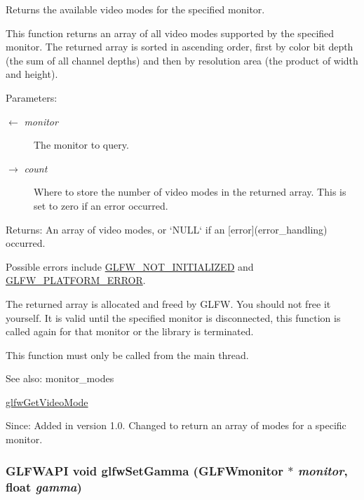 Returns the available video modes for the specified monitor. 

This function returns an array of all video modes supported by the specified monitor. The returned array is sorted in ascending order, first by color bit depth (the sum of all channel depths) and then by resolution area (the product of width and height).

\begin{Desc}
\item[Parameters:]
\begin{description}
\item[\mbox{$\leftarrow$} {\em monitor}]The monitor to query. \item[\mbox{$\rightarrow$} {\em count}]Where to store the number of video modes in the returned array. This is set to zero if an error occurred. \end{description}
\end{Desc}
\begin{Desc}
\item[Returns:]An array of video modes, or `NULL` if an \mbox{[}error\mbox{]}(error\_\-handling) occurred.\end{Desc}
Possible errors include \hyperlink{group__errors_g2374ee02c177f12e1fa76ff3ed15e14a}{GLFW\_\-NOT\_\-INITIALIZED} and \hyperlink{group__errors_gd44162d78100ea5e87cdd38426b8c7a1}{GLFW\_\-PLATFORM\_\-ERROR}.

The returned array is allocated and freed by GLFW. You should not free it yourself. It is valid until the specified monitor is disconnected, this function is called again for that monitor or the library is terminated.

This function must only be called from the main thread.

\begin{Desc}
\item[See also:]monitor\_\-modes 

\hyperlink{group__monitor_gc234b63ec525c70d7e18ac84aca088c6}{glfwGetVideoMode}\end{Desc}
\begin{Desc}
\item[Since:]Added in version 1.0.  Changed to return an array of modes for a specific monitor. \end{Desc}
\hypertarget{group__monitor_g3e4ab484476c935b4cd0bf49a5c429d6}{
\subsubsection[glfwSetGamma]{\setlength{\rightskip}{0pt plus 5cm}GLFWAPI void glfwSetGamma ({\bf GLFWmonitor} $\ast$ {\em monitor}, \/  float {\em gamma})}}
\label{group__monitor_g3e4ab484476c935b4cd0bf49a5c429d6}


